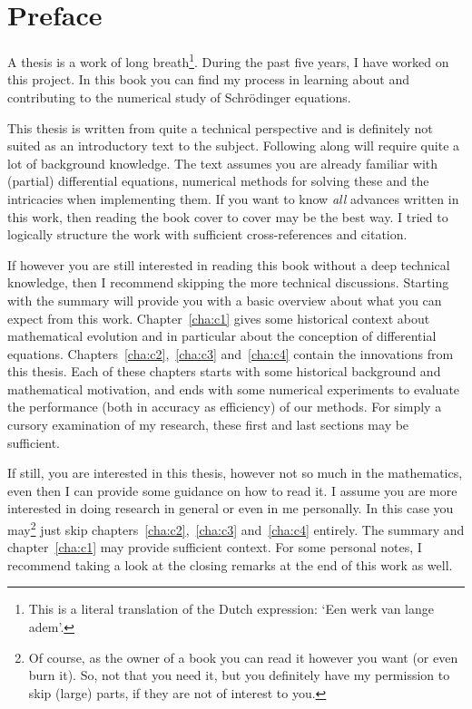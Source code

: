 


\chapter*{Preface}

A thesis is a work of long breath\footnote{This is a literal translation of the Dutch expression: `\foreignlanguage{dutch}{Een werk van lange adem}'.}. During the past five years, I have worked on this project. In this book you can find my process in learning about and contributing to the numerical study of Schrödinger equations.

This thesis is written from quite a technical perspective and is definitely not suited as an introductory text to the subject. Following along will require quite a lot of background knowledge. The text assumes you are already familiar with (partial) differential equations, numerical methods for solving these and the intricacies when implementing them. If you want to know \emph{all} advances written in this work, then reading the book cover to cover may be the best way. I tried to logically structure the work with sufficient cross-references and citation.

If however you are still interested in reading this book without a deep technical knowledge, then I recommend skipping the more technical discussions. Starting with the summary will provide you with a basic overview about what you can expect from this work. Chapter~\ref{cha:c1} gives some historical context about mathematical evolution and in particular about the conception of differential equations. Chapters~\ref{cha:c2},~\ref{cha:c3} and~\ref{cha:c4} contain the innovations from this thesis. Each of these chapters starts with some historical background and mathematical motivation, and ends with some numerical experiments to evaluate the performance (both in accuracy as efficiency) of our methods. For simply a cursory examination of my research, these first and last sections may be sufficient.

If still, you are interested in this thesis, however not so much in the mathematics, even then I can provide some guidance on how to read it. I assume you are more interested in doing research in general or even in me personally. In this case you may\footnote{Of course, as the owner of a book you can read it however you want (or even burn it). So, not that you need it, but you definitely have my permission to skip (large) parts, if they are not of interest to you.} just skip chapters~\ref{cha:c2},~\ref{cha:c3} and~\ref{cha:c4} entirely. The summary and chapter~\ref{cha:c1} may provide sufficient context. For some personal notes, I recommend taking a look at the closing remarks at the end of this work as well.

